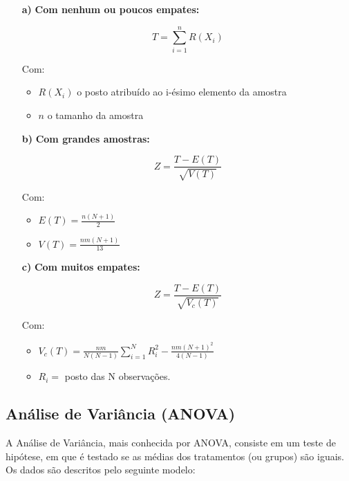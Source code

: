 \documentclass[
]{estat/estat}
\begin{document}
\begin{itemize}
\item [\bf a)] \textbf{Com nenhum ou poucos empates:}

$$T = \sum_{i=1}^{n}R(X_{i})$$

Com:
\begin{itemize}
\item $R(X_{i})$ o posto atribuído ao i-ésimo elemento da amostra

\item $n$ o tamanho da amostra

\end{itemize}

\item [\bf b)] \textbf{Com grandes amostras:}

$$Z = \frac{T - E(T)}{\sqrt{V(T)}}$$

Com:
\begin{itemize}
\item $E(T) = \displaystyle\frac{n(N+1)}{2}$ 

\item $V(T) = \displaystyle\frac{nm(N+1)}{13}$

\end{itemize}

\item [\bf c)] \textbf{Com muitos empates:}

$$Z = \frac{T - E(T)}{\sqrt{V_{c}(T)}}$$

Com:
\begin{itemize}
\item $V_{c}(T) = \displaystyle \frac{nm}{N(N-1)}\sum_{i=1}^{N}R^{2}_{i}-\frac{nm(N+1)^{2}}{4(N-1)}$ 

\item $R_{i} = $ posto das N observações.

\end{itemize}

\end{itemize}

\hypertarget{anuxe1lise-de-variuxe2ncia-anova}{%
\subsection{Análise de Variância
(ANOVA)}\label{anuxe1lise-de-variuxe2ncia-anova}}

A Análise de Variância, mais conhecida por ANOVA, consiste em um teste
de hipótese, em que é testado se as médias dos tratamentos (ou grupos)
são iguais. Os dados são descritos pelo seguinte modelo:
\end{document}
